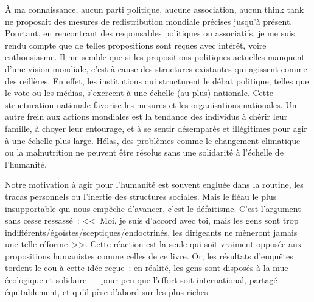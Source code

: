 \documentclass[a5paper,french,openany]{memoir}
\begin{document}
À ma connaissance, aucun parti politique, aucune association, aucun think tank ne proposait des mesures de redistribution mondiale précises jusqu'à présent. Pourtant, en rencontrant des responsables politiques ou associatifs, je me suis rendu compte que de telles propositions sont reçues avec intérêt, voire enthousiasme. Il me semble que si les propositions politiques actuelles manquent d'une vision mondiale, c'est à cause des structures existantes qui agissent comme des œillères. En effet, les institutions qui structurent le débat politique, telles que le vote ou les médias, s'exercent à une échelle (au plus) nationale. Cette structuration nationale favorise les mesures et les organisations nationales. Un autre frein aux actions mondiales est la tendance des individus à chérir leur famille, à choyer leur entourage, et à se sentir désemparés et illégitimes pour agir à une échelle plus large. %
Hélas, des problèmes comme le changement climatique ou la malnutrition ne peuvent être résolus sans une solidarité à l'échelle de l'humanité. 

Notre motivation à agir pour l'humanité est souvent engluée dans la routine, les tracas personnels ou l'inertie des structures sociales. %
Mais le fléau le plus insupportable qui nous empêche d'avancer, c'est le défaitisme. C'est l'argument sans cesse ressassé~: <<~Moi, je suis d'accord avec toi, mais les gens sont trop indifférents/égoïstes/sceptiques/endoctrinés, les dirigeants ne mèneront jamais une telle réforme~>>. Cette réaction est la seule qui soit vraiment opposée aux propositions humanistes comme celles de ce livre. %
Or, les résultats d'enquêtes tordent le cou à cette idée reçue~: en réalité, les gens sont disposés à la mue écologique et solidaire --- pour peu que l'effort soit international, partagé équitablement, et qu'il pèse d'abord sur les plus riches. %
\end{document}

